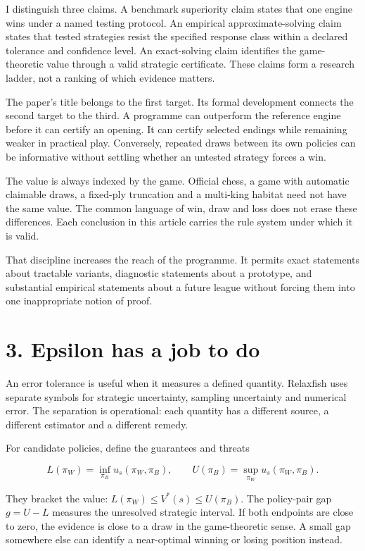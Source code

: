 \documentclass[10pt]{article}
\begin{document}
I distinguish three claims. A benchmark superiority claim states that one engine wins under a named testing protocol. An empirical approximate-solving claim states that tested strategies resist the specified response class within a declared tolerance and confidence level. An exact-solving claim identifies the game-theoretic value through a valid strategic certificate. These claims form a research ladder, not a ranking of which evidence matters.

The paper's title belongs to the first target. Its formal development connects the second target to the third. A programme can outperform the reference engine before it can certify an opening. It can certify selected endings while remaining weaker in practical play. Conversely, repeated draws between its own policies can be informative without settling whether an untested strategy forces a win.

The value is always indexed by the game. Official chess, a game with automatic claimable draws, a fixed-ply truncation and a multi-king habitat need not have the same value. The common language of win, draw and loss does not erase these differences. Each conclusion in this article carries the rule system under which it is valid.

That discipline increases the reach of the programme. It permits exact statements about tractable variants, diagnostic statements about a prototype, and substantial empirical statements about a future league without forcing them into one inappropriate notion of proof.

\clearpage
\section*{3. Epsilon has a job to do}
An error tolerance is useful when it measures a defined quantity. Relaxfish uses separate symbols for strategic uncertainty, sampling uncertainty and numerical error. The separation is operational: each quantity has a different source, a different estimator and a different remedy.

For candidate policies, define the guarantees and threats

\[
L(\pi_W)=\inf_{\pi_B}u_s(\pi_W,\pi_B),\qquad
U(\pi_B)=\sup_{\pi_W}u_s(\pi_W,\pi_B).
\]

They bracket the value: $L(\pi_W)\le V^*(s)\le U(\pi_B)$. The policy-pair gap $g=U-L$ measures the unresolved strategic interval. If both endpoints are close to zero, the evidence is close to a draw in the game-theoretic sense. A small gap somewhere else can identify a near-optimal winning or losing position instead.
\end{document}
